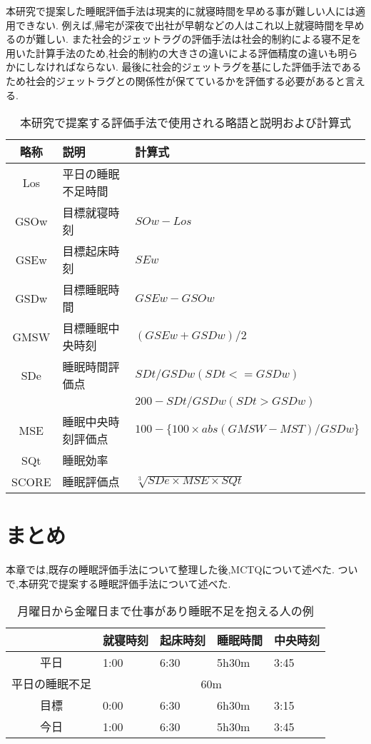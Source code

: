 本研究で提案した睡眠評価手法は現実的に就寝時間を早める事が難しい人には適用できない.
例えば,帰宅が深夜で出社が早朝などの人はこれ以上就寝時間を早めるのが難しい.
また社会的ジェットラグの評価手法は社会的制約による寝不足を用いた計算手法のため,社会的制約の大きさの違いによる評価精度の違いも明らかにしなければならない.
最後に社会的ジェットラグを基にした評価手法であるため社会的ジェットラグとの関係性が保てているかを評価する必要があると言える.
\begin{table}[htbp]
	\begin{center}
	\begin{tabular}{|c|l|l|}
  	\hline
  	略称 & 説明 & 計算式\\
  	\hline
	Los & 平日の睡眠不足時間 & \\
	GSOw & 目標就寝時刻 & $ SOw - Los $\\
	GSEw & 目標起床時刻 & $ SEw $\\
	GSDw& 目標睡眠時間 & $ GSEw - GSOw $\\
	GMSW& 目標睡眠中央時刻 & $ (GSEw + GSDw) / 2 $\\
	SDe& 睡眠時間評価点& $ SDt / GSDw (SDt <= GSDw) $\\
	& & $200 - SDt / GSDw (SDt > GSDw) $\\
	MSE & 睡眠中央時刻評価点 & $ 100 - \{100 × abs(GMSW - MST)/GSDw\} $\\
	SQt & 睡眠効率 & \\
	SCORE & 睡眠評価点 & \(\sqrt[3]{SDe × MSE × SQt} \) \\
	\hline
 	\end{tabular}
 	\end{center}
 	\caption{本研究で提案する評価手法で使用される略語と説明および計算式}
 	\label{mctq}
\end{table}

\newpage
\section{まとめ}
本章では,既存の睡眠評価手法について整理した後,MCTQについて述べた.
ついで,本研究で提案する睡眠評価手法について述べた.

\begin{table}[htbp]
	\begin{center}
	\begin{tabular}{|c|l|l|l|l|}
  	\hline
  	 & 就寝時刻 & 起床時刻 & 睡眠時間 & 中央時刻\\
	\hline
	 平日 & 1:00 & 6:30 & 5h30m & 3:45 \\
	 \hline
	 平日の睡眠不足 & \multicolumn{4}{c|}{60m} \\
	 \hline
	 目標 & 0:00 & 6:30 & 6h30m & 3:15 \\
	 \hline
	 今日 & 1:00 & 6:30 & 5h30m & 3:45 \\
	 \hline
 	\end{tabular}
 	\end{center}
 	\caption{月曜日から金曜日まで仕事があり睡眠不足を抱える人の例}
 	\label{mctq_example}
\end{table}

